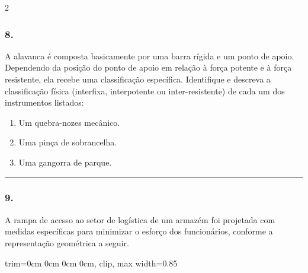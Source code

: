 \documentclass[twoside, 10pt, a4paper]{article}
\newlength{\espacoPreQuestao}\setlength{\espacoPreQuestao}{0.1cm}
\newlength{\espacoQuestao}\setlength{\espacoQuestao}{0.2cm}
\newlength{\espacoAlt}\setlength{\espacoAlt}{0.2cm}
\newcommand{\larguraTikz}{0.85\linewidth}
\begin{document}
\begin{multicols*}{2}
\subsubsection*{8.} A alavanca é composta basicamente por uma barra rígida e um ponto de apoio. Dependendo da posição do ponto de apoio em relação à força potente e à força resistente, ela recebe uma classificação específica. Identifique e descreva a classificação física (interfixa, interpotente ou inter-resistente) de cada um dos instrumentos listados:
\begin{enumerate}[label=\Roman*., itemsep=\espacoAlt]
    \item Um quebra-nozes mecânico.
    \item Uma pinça de sobrancelha.
    \item Uma gangorra de parque.
\end{enumerate}
\par\vspace{\espacoQuestao}

\noindent\textcolor{CorLinha}{\rule{\linewidth}{0.5pt}} 
\par\vspace{\espacoPreQuestao}
\subsubsection*{9.} A rampa de acesso ao setor de logística de um armazém foi projetada com medidas específicas para minimizar o esforço dos funcionários, conforme a representação geométrica a seguir.
\begin{center}
\begin{adjustbox}{trim=0cm 0cm 0cm 0cm, clip, max width=\larguraTikz}
\end{adjustbox}
\end{center}
\end{multicols*}
\end{document}
